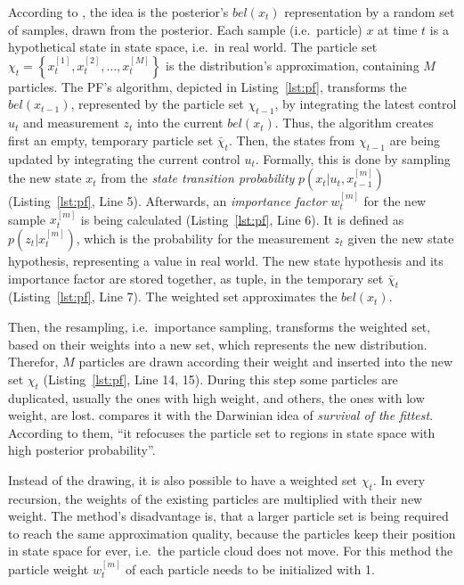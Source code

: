 According to \citet{thrun:prob_robo}, the idea is the posterior's $bel(x_t)$ representation by a random set of samples, drawn from the posterior. Each sample (i.e.\ particle) $x$ at time $t$ is a hypothetical state in state space, i.e.\ in real world. The particle set $\chi_t = \left\{ x^{[1]}_t, x^{[2]}_t, \ldots, x^{[M]}_t \right\}$ is the distribution's approximation, containing $M$ particles. The \ac{PF}'s algorithm, depicted in Listing~\ref{lst:pf}, transforms the $bel(x_{t-1})$, represented by the particle set $\chi_{t-1}$, by integrating the latest control $u_t$ and measurement $z_t$ into the current $bel(x_t)$. Thus, the algorithm creates first an empty, temporary particle set $\bar{\chi}_t$. Then, the states from $\chi_{t-1}$ are being updated by integrating the current control $u_t$. Formally, this is done by sampling the new state $x_t$ from the \emph{state transition probability} $p(x_t|u_t, x^{[m]}_{t-1})$ (Listing~\ref{lst:pf}, Line 5). Afterwards, an \emph{importance factor} $w^{[m]}_t$ for the new sample $x^{[m]}_t$ is being calculated (Listing~\ref{lst:pf}, Line 6). It is defined as $p(z_t|x^{[m]}_t)$, which is the probability for the measurement $z_t$ given the new state hypothesis, representing a value in real world. The new state hypothesis and its importance factor are stored together, as tuple, in the temporary set $\bar{\chi}_t$ (Listing~\ref{lst:pf}, Line 7). The weighted set approximates the $bel(x_t)$.

Then, the resampling, i.e.\ importance sampling, transforms the weighted set, based on their weights into a new set, which represents the new distribution. Therefor, $M$ particles are drawn according their weight and inserted into the new set $\chi_t$ (Listing~\ref{lst:pf}, Line 14, 15). During this step some particles are duplicated, usually the ones with high weight, and others, the ones with low weight, are lost. \citet{thrun:prob_robo} compares it with the Darwinian idea of \emph{survival of the fittest}. According to them, ``it refocuses the particle set to regions in state space with high posterior probability''.
 
Instead of the drawing, it is also possible to have a weighted set $\chi_t$. In every recursion, the weights of the existing particles are multiplied with their new weight. The method's disadvantage is, that a larger particle set is being required to reach the same approximation quality, because the particles keep their position in state space for ever, i.e.\ the particle cloud does not move. For this method the particle weight $w^{[m]}_t$ of each particle needs to be initialized with 1.
 
